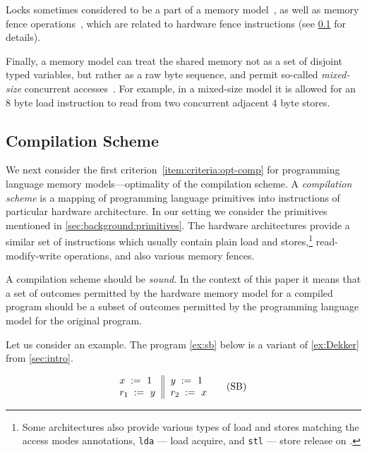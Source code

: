 Locks sometimes considered to be a part 
of a memory model~\cite{Manson-al:POPL05}, 
as well as memory fence operations~\cite{Batty-al:POPL11},
which are related to hardware fence instructions
(see \cref{sec:background:compile} for details). 

Finally, a memory model can treat the shared memory 
not as a set of disjoint typed variables, but rather as 
a raw byte sequence, and permit so-called \emph{mixed-size} 
concurrent accesses~\cite{Flur-al:POPL17}.
For example, in a mixed-size model it is 
allowed for an 8 byte load instruction 
to read from two concurrent adjacent 4 byte stores. 

\subsection{Compilation Scheme}
\label{sec:background:compile}

We next consider the first criterion~\ref{item:criteria:opt-comp}
for programming language memory models---optimality of the compilation scheme. 
A \emph{compilation scheme} is a mapping of 
programming language primitives into 
instructions of particular hardware architecture. 
In our setting we consider the primitives 
mentioned in \cref{sec:background:primitives}.
The hardware architectures provide a similar set 
of instructions which usually contain 
plain load and stores,\footnote{Some architectures 
also provide various types of load and stores
matching the access modes annotations, 
\eg \texttt{lda} --- load acquire, 
and \texttt{stl} --- store release on .} 
read-modify-write operations, 
and also various memory fences. 

A compilation scheme should be \emph{sound}.
In the context of this paper it means that 
a set of outcomes permitted by  
the hardware memory model for a compiled program 
should be a subset of outcomes permitted by the 
programming language model for the original program. 

Let us consider an example. 
The program \ref{ex:sb} below is a 
variant of \ref{ex:Dekker} from \cref{sec:intro}.

\begin{equation*}
\inarrII{
   \writeInst{}{x}{1}   \\
   \readInst{}{r_1}{y}  \\
}{
  \writeInst{}{y}{1}   \\
  \readInst{}{r_2}{x}  \\
}
\tag{SB}\label{ex:sb}
\end{equation*}

